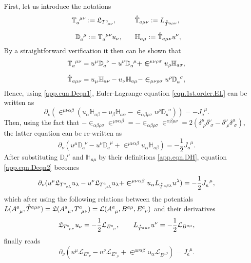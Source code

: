 \documentclass[
10pt, %
a4paper, %
oneside, %
headinclude,footinclude, %
BCOR5mm, %
]{scrartcl}
\newcommand{\tetr}[2]{A^{#1}_{\phantom{#1}#2}}
\newcommand{\D}[1]{\partial_{#1}} %
\newcommand{\Tors}[2]{T^{#1}_{\phantom{a}#2}}
\newcommand{\ET}[2]{E^{#1}_{\phantom{#1}#2}}	%
\newcommand{\BT}[2]{B^{#1#2}}	%
\newcommand{\Laghodge}{L}%
\newcommand{\Lagtors}{\mathfrak{L}}%
\newcommand{\LagBE}{\mathcal{L}}%
\newcommand{\LCsymb}{\bm{\in}}    %
\newcommand{\HDT}[1]{\accentset{\star}{T}^{#1}}
\newcommand{\KD}[2]{\delta^{#1}_{\,\,#2}}
\newcommand{\NC}[2]{J^{\phantom{#1}#2}_{#1}}
\newcommand{\TorsConj}[2]{\mathbb{T}_{#1}^{\phantom{#1}#2}}
\newcommand{\HTConj}[1]{\accentset{\star}{\mathbb{T}}_{#1}}
\newcommand{\Dbb}[2]{\mathbb{D}_{#1}^{\phantom{#1}#2}}
\newcommand{\Hbb}[2]{\mathbb{H}_{#1#2}}
\begin{document}
First, let us introduce the notations
\begin{subequations}
	\begin{align}
			\TorsConj{a}{\mu\nu} := \Lagtors_{\Tors{a}{\mu\nu}},\hspace{1cm}
			&\HTConj{a\mu\nu} := \Laghodge_{\HDT{a\mu\nu}}, 
			\\[2mm]
			\Dbb{a}{\mu} := \TorsConj{a}{\mu\nu}u_\nu, \qquad
			&\Hbb{a}{\mu} := \HTConj{a\mu\nu}u^\nu,\label{app.eqn.DH}
	\end{align}
\end{subequations}
By a straightforward verification it then can be shown that
\begin{subequations}
	\begin{align}
	\TorsConj{a}{\mu\nu} &= u^\mu \Dbb{a}{\nu} - u^\nu \Dbb{a}{\mu} +
	\LCsymb^{\mu\nu\rho\sigma}u_\rho \Hbb{a}{\sigma},\\[2mm]
	\HTConj{a\mu\nu} &= u_\mu \Hbb{a}{\nu} - u_\nu \Hbb{a}{\mu} - 
	\LCsymb_{\mu\nu\rho\sigma}u^\rho \Dbb{a}{\sigma}\label{app.eqn.Deqn1},
	\end{align}
\end{subequations}
Hence, using \eqref{app.eqn.Deqn1}, Euler-Lagrange equation \eqref{eqn.1st.order.EL} can be written 
as
\begin{equation}
\D{\nu}(\LCsymb^{\mu\nu\alpha\beta}(u_\alpha \Hbb{a}{\beta} - u_\beta \Hbb{a}{\alpha} - 
\LCsymb_{\alpha\beta\rho\sigma}u^\rho \Dbb{a}{\sigma})) = -\NC{a}{\mu}.
\end{equation}
Then, using the fact that $ -\LCsymb_{\alpha\beta\rho\sigma}\LCsymb^{\mu\nu\alpha\beta} = 
-\LCsymb_{\alpha\beta\rho\sigma}\LCsymb^{\alpha\beta\mu\nu} = 2(\KD{\mu}{\rho}\KD{\nu}{\sigma} - 
\KD{\nu}{\rho}\KD{\mu}{\sigma})$, the latter equation can be re-written as
\begin{equation}\label{app.eqn.Deqn2}
	\D{\nu}(u^\mu \Dbb{a}{\nu} - u^\nu \Dbb{a}{\mu} + \LCsymb^{\mu\nu\alpha\beta}
	u_\alpha\Hbb{a}{\beta}) = -\frac12\NC{a}{\mu}.
\end{equation}
After substituting $ \Dbb{a}{\mu} $ and $ \Hbb{a}{\mu} $ by their definitions \eqref{app.eqn.DH}, 
equation \eqref{app.eqn.Deqn2} becomes
\begin{equation}
	\D{\nu}(u^\mu \Lagtors_{\Tors{a}{\nu\lambda}}u_\lambda - u^\nu \Lagtors_{\Tors{a}{\mu\lambda}} 
	u_\lambda + \LCsymb^{\mu\nu\alpha\beta}u_\alpha \Laghodge_{\HDT{a\beta\lambda}}u^\lambda) = 
	-\frac12 \NC{a}{\mu},
\end{equation}
which after using the following relations between the potentials $ 
\Laghodge(\tetr{a}{\mu},\HDT{a\mu\nu}) = 
\Lagtors(\tetr{a}{\mu},\Tors{a}{\mu\nu}) = 
\LagBE(\tetr{a}{\mu},\BT{a}{\mu},\ET{a}{\nu}) $ and their derivatives
\begin{equation}
	\Lagtors_{\Tors{a}{\mu\nu}} u_\nu = -\frac12\LagBE_{\ET{a}{\mu}},
	\qquad
	\Laghodge_{\HDT{a\mu\nu}} u^\nu= -\frac12\LagBE_{\BT{a}{\mu}},
\end{equation}
finally reads
\begin{equation}
	\D{\nu}( u^\mu\LagBE_{\ET{a}{\nu}} - u^\nu \LagBE_{\ET{a}{\mu}} + 
	\LCsymb^{\mu\nu\alpha
	\beta}u_\alpha\LagBE_{\BT{a}{\beta}}) 
	= \NC{a}{\mu}.
\end{equation}

\printbibliography
\end{document}

